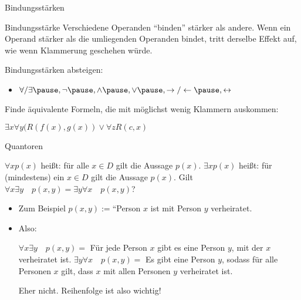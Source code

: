 \begin{frame}{Bindungsstärken}
	\begin{block}{Bindungsstärke}
		Verschiedene Operanden ``binden'' stärker als andere. \ip Wenn ein Operand stärker als die umliegenden Operanden bindet, tritt derselbe Effekt auf, wie wenn Klammerung geschehen würde.
	\end{block}

	\bp
	
	Bindungsstärken absteigen:
	\begin{itemize}
		\ip \item $\forall / \exists\ip,\lnot\ip,\land\ip,\lor\ip,\rightarrow/\leftarrow\ip,\leftrightarrow$
	\end{itemize}

	\bp
	
	Finde äquivalente Formeln, die mit möglichst wenig Klammern auskommen:
	\begin{itemize}
		\pitem $\exists x \forall y (R(f(x), g(x)) \lor \forall z R(c, x)$ %
	\end{itemize}

\end{frame}

\begin{frame}{Quantoren}
\begin{itemize}
	\pitem $\forall x p(x)$ heißt\ip: für alle $x \in D$ gilt die Aussage $p(x)$.
	\pitem $\exists x p(x)$ heißt\ip: für (mindestens) ein $x \in D$ gilt die Aussage $p(x)$.
	\pitem Gilt $\forall x \exists y \quad p(x,y) = \exists y \forall x \quad p(x,y)$?
	\begin{itemize}
		\pause\item Zum Beispiel $p(x,y) := $``Person $x$ ist mit Person $y$ verheiratet.
		\pause\item Also:
		\begin{itemize}
			\pitem $\forall x \exists y \quad p(x,y) = $ Für jede Person $x$ gibt es eine Person $y$, mit der $x$ verheiratet ist.
			\pitem $\exists y \forall x \quad p(x,y) = $ Es gibt eine Person $y$, sodass für alle Personen $x$ gilt, dass $x$ mit allen Personen $y$ verheiratet ist.
		\end{itemize}
		\pitem Eher nicht. \ip Reihenfolge ist also wichtig!
	\end{itemize}
\end{itemize}
\end{frame}

